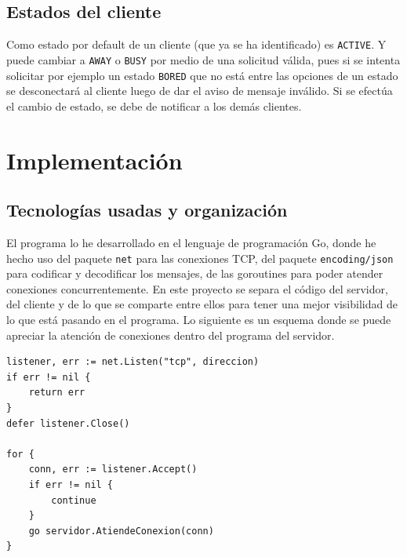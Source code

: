 \documentclass[12pt,a4paper]{article}
\begin{document}
\newpage
\subsection*{Estados del cliente}
Como estado por default de un cliente (que ya se ha identificado) es \texttt{ACTIVE}.
Y puede cambiar a \texttt{AWAY} o \texttt{BUSY} por medio de una solicitud válida,
pues si se intenta solicitar por ejemplo un estado \texttt{BORED} que no está entre
las opciones de un estado se desconectará al cliente luego de dar el aviso de mensaje
inválido. Si se efectúa el cambio de estado, se debe de notificar a los demás clientes.

\begin{center}
\end{center}

\newpage
\section*{Implementación}

\subsection*{Tecnologías usadas y organización}
El programa lo he desarrollado en el lenguaje de programación Go, donde he hecho
uso del paquete \texttt{net} para las conexiones TCP, del paquete \texttt{encoding/json}
para codificar y decodificar los mensajes, de las goroutines para poder atender
conexiones concurrentemente. En este proyecto se separa el código del servidor, del
cliente y de lo que se comparte entre ellos para tener una mejor visibilidad de lo
que está pasando en el programa. Lo siguiente es un esquema donde se puede apreciar
la atención de conexiones dentro del programa del servidor.

\begin{lstlisting}[style=gocode,caption={Esquema simplificado de atención de conexiones}]
listener, err := net.Listen("tcp", direccion)
if err != nil {
    return err
}
defer listener.Close()

for {
    conn, err := listener.Accept()
    if err != nil {
        continue
    }
    go servidor.AtiendeConexion(conn)
}
\end{lstlisting}
\end{document}
